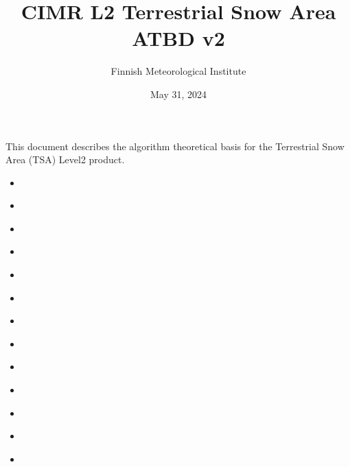 \documentclass[letterpaper,10pt,english]{jupyterBook}
\title{CIMR L2 Terrestrial Snow Area ATBD v2}
\date{May 31, 2024}
\author{Finnish Meteorological Institute}
\begin{document}
\pagestyle{empty}
\sphinxmaketitle
\pagestyle{plain}
\sphinxtableofcontents
\pagestyle{normal}
\label{\detokenize{book/intro::doc}}


\sphinxAtStartPar
This document describes the algorithm theoretical basis for the Terrestrial Snow Area (TSA) Level\sphinxhyphen{}2 product.
\begin{itemize}
\item {} 
\sphinxAtStartPar
{\hyperref[\detokenize{book/abstract::doc}]{}}

\item {} 
\sphinxAtStartPar
{\hyperref[\detokenize{book/applicable_ref_docs::doc}]{}}

\item {} 
\sphinxAtStartPar
{\hyperref[\detokenize{book/acronyms::doc}]{}}

\item {} 
\sphinxAtStartPar
{\hyperref[\detokenize{book/definitions::doc}]{}}

\item {} 
\sphinxAtStartPar
{\hyperref[\detokenize{book/introduction_purpose_scope::doc}]{}}

\item {} 
\sphinxAtStartPar
{\hyperref[\detokenize{book/background_justification_algorithm::doc}]{}}

\item {} 
\sphinxAtStartPar
{\hyperref[\detokenize{book/L2_product_definition::doc}]{}}

\item {} 
\sphinxAtStartPar
{\hyperref[\detokenize{book/baseline_algorithm_definition::doc}]{}}

\item {} 
\sphinxAtStartPar
{\hyperref[\detokenize{book/algorithm_input_output_data_definition::doc}]{}}

\item {} 
\sphinxAtStartPar
{\hyperref[\detokenize{book/algorithm_performance_assessment::doc}]{}}

\item {} 
\sphinxAtStartPar
{\hyperref[\detokenize{book/roadmap::doc}]{}}

\item {} 
\sphinxAtStartPar
{\hyperref[\detokenize{book/references::doc}]{}}

\item {} 
\sphinxAtStartPar
{\hyperref[\detokenize{book/annex::doc}]{}}

\end{itemize}
\end{document}
